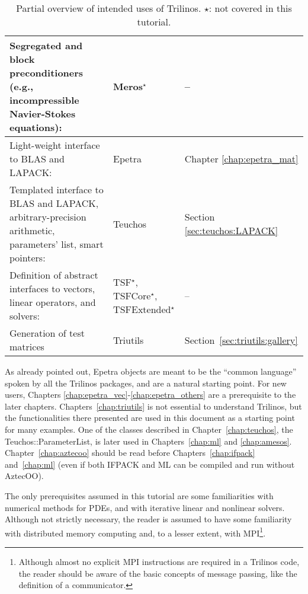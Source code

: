 \begin{table}[htbp]
\begin{tabular}{| p{8cm} | p{2.5cm} | p{3cm} |}
    Segregated and block preconditioners (e.g., incompressible
    Navier-Stokes equations):& 
    Meros$^\star$ & -- \\
    \hline
    Light-weight interface to BLAS and LAPACK: & Epetra 
    & Chapter \ref{chap:epetra_mat} \\
    \hline
    Templated interface to BLAS and LAPACK, arbitrary-precision
    arithmetic, parameters' list, smart pointers:& Teuchos &
    Section \ref{sec:teuchos:LAPACK} \\
    \hline
    Definition of abstract interfaces to vectors, linear operators, and
    solvers:& TSF$^\star$, TSFCore$^\star$, TSFExtended$^\star$   & --
    \\
    \hline
    Generation of test matrices & Triutils & Section~\ref{sec:triutils:gallery} \\
    \hline
  \end{tabular}
  \caption{Partial overview of intended uses of  Trilinos. $\star$:
    not covered in this tutorial.}
  \label{tab:tripackages}
\end{table}

\begin{remark}
  As already pointed out, Epetra objects are meant to be the ``common
  language'' spoken by all the Trilinos packages, and are a natural
  starting point. For new users, Chapters
  \ref{chap:epetra_vec}-\ref{chap:epetra_others} are a prerequisite to
  the later chapters. Chapters~\ref{chap:triutils} is not essential to
  understand Trilinos, but the functionalities there presented are used
  in this document as a starting point for many examples.  One of the
  classes described in Chapter~\ref{chap:teuchos}, the
  Teuchos::ParameterList, is later used in Chapters~\ref{chap:ml} and
  \ref{chap:amesos}.  Chapter~\ref{chap:aztecoo} should be read before
  Chapters~\ref{chap:ifpack} and~\ref{chap:ml} (even if both IFPACK and
  ML can be compiled and run without AztecOO).
\end{remark}

The only prerequisites assumed in this tutorial are some familiarities
with numerical methods for PDEs, and with iterative linear and nonlinear
solvers. Although not strictly necessary, the reader is assumed to have
some familiarity with distributed memory computing and, to a lesser
extent, with MPI\footnote{Although almost no explicit MPI instructions
  are required in a Trilinos code, the reader should be aware of the
  basic concepts of message passing, like the definition of a
  communicator.}.

